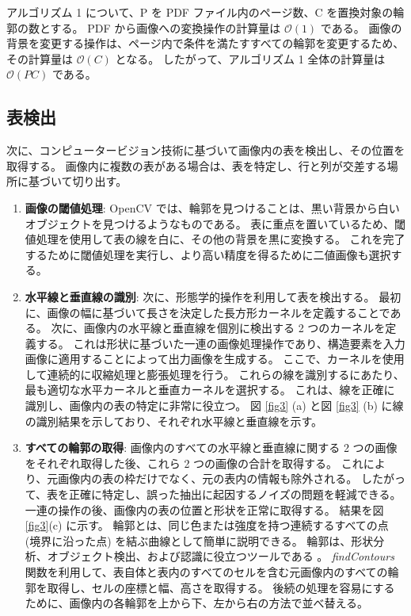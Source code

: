 \documentclass[uplatex, twocolumn,10pt]{jsarticle}
\begin{document}
アルゴリズム 1 について、P を PDF ファイル内のページ数、C を置換対象の輪郭の数とする。
PDF から画像への変換操作の計算量は $\mathcal{O}(1)$ である。
画像の背景を変更する操作は、ページ内で条件を満たすすべての輪郭を変更するため、その計算量は $\mathcal{O}(C)$ となる。
したがって、アルゴリズム 1 全体の計算量は $\mathcal{O}(PC)$ である。

\subsection{表検出}
次に、コンピュータービジョン技術に基づいて画像内の表を検出し、その位置を取得する。
画像内に複数の表がある場合は、表を特定し、行と列が交差する場所に基づいて切り出す。

\begin{enumerate}
    \item \textbf{画像の閾値処理}: 
    OpenCV では、輪郭を見つけることは、黒い背景から白いオブジェクトを見つけるようなものである。
    表に重点を置いているため、閾値処理を使用して表の線を白に、その他の背景を黒に変換する。
    これを完了するために閾値処理を実行し、より高い精度を得るために二値画像も選択する。
    \item \textbf{水平線と垂直線の識別}:
    次に、形態学的操作を利用して表を検出する。
    最初に、画像の幅に基づいて長さを決定した長方形カーネルを定義することである。
    次に、画像内の水平線と垂直線を個別に検出する 2 つのカーネルを定義する。
    これは形状に基づいた一連の画像処理操作であり、構造要素を入力画像に適用することによって出力画像を生成する。
    ここで、カーネルを使用して連続的に収縮処理と膨張処理を行う。
    これらの線を識別するにあたり、最も適切な水平カーネルと垂直カーネルを選択する。
    これは、線を正確に識別し、画像内の表の特定に非常に役立つ。
    図 \ref{fig3} (a) と図 \ref{fig3} (b) に線の識別結果を示しており、それぞれ水平線と垂直線を示す。
    \item \textbf{すべての輪郭の取得}:
    画像内のすべての水平線と垂直線に関する 2 つの画像をそれぞれ取得した後、これら 2 つの画像の合計を取得する。
    これにより、元画像内の表の枠だけでなく、元の表内の情報も除外される。
    したがって、表を正確に特定し、誤った抽出に起因するノイズの問題を軽減できる。
    一連の操作の後、画像内の表の位置と形状を正常に取得する。
    結果を図 \ref{fig3}(c) に示す。
    輪郭とは、同じ色または強度を持つ連続するすべての点 (境界に沿った点) を結ぶ曲線として簡単に説明できる。
    輪郭は、形状分析、オブジェクト検出、および認識に役立つツールである \cite{bib24}。
    \textit{findContours} 関数を利用して、表自体と表内のすべてのセルを含む元画像内のすべての輪郭を取得し、セルの座標と幅、高さを取得する。
    後続の処理を容易にするために、画像内の各輪郭を上から下、左から右の方法で並べ替える。
\end{enumerate}
\end{document}

